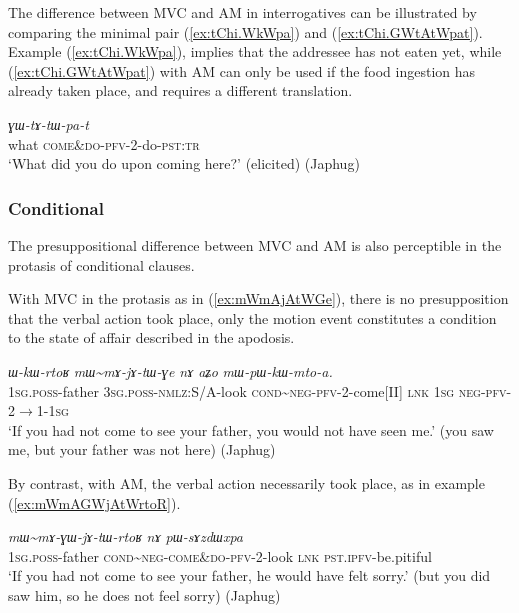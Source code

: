 \documentclass[oneside,a4paper,11pt]{article}
\newcommand{\ipa}[1]{{\phon\textit{#1}}}
\newcommand{\redp}{\textasciitilde}
\newcommand{\rouge}[1]{{\color{red}#1}}
\newcommand{\fl}{$\rightarrow$}
\begin{document}
The difference between MVC and AM in interrogatives can be illustrated by comparing the minimal pair  (\ref{ex:tChi.WkWpa}) and (\ref{ex:tChi.GWtAtWpat}). Example (\ref{ex:tChi.WkWpa}),  implies that the addressee has not eaten yet, while (\ref{ex:tChi.GWtAtWpat}) with AM can only be used if the food ingestion has already taken place, and requires a different translation.

\begin{exe}
\ex \label{ex:tChi.GWtAtWpat}
\gll \ipa{tɕʰi}	\ipa{\rouge{ɣɯ}-tɤ-tɯ-pa-t}  \\
what \rouge{\textsc{come\&do}}-\textsc{pfv}-2-do-\textsc{pst:tr}    \\
\glt `What did you do upon coming here?' (elicited) (Japhug)
\end{exe}

 

\subsubsection{Conditional} \label{sec:am.conditional}
The presuppositional difference between MVC and AM is also perceptible in the protasis of conditional clauses. 

With MVC in the protasis as in (\ref{ex:mWmAjAtWGe}), there is no presupposition that the verbal action took place, only the motion event constitutes a condition to the state of affair described in the apodosis.

\begin{exe}
\ex \label{ex:mWmAjAtWGe}
\gll \ipa{nɤ-wa}	\ipa{ɯ-kɯ-rtoʁ}	\ipa{mɯ\redp{}mɤ-jɤ-tɯ-ɣe}	\ipa{nɤ}	\ipa{aʑo}	\ipa{mɯ-pɯ-kɯ-mto-a.}
 \\
\textsc{1sg.poss}-father \textsc{3sg.poss-}\textsc{nmlz}:S/A-look \textsc{cond}\redp{}\textsc{neg}-\textsc{pfv}-2-come[II] \textsc{lnk} \textsc{1sg} \textsc{neg}-\textsc{pfv}-2\fl{}1-\textsc{1sg} \\
\glt `If you had not come to see your father, you would not have seen me.' (you saw me, but your father was not here) (Japhug)
\end{exe}

By contrast, with AM, the verbal action necessarily took place, as in example (\ref{ex:mWmAGWjAtWrtoR}).

\begin{exe}
\ex \label{ex:mWmAGWjAtWrtoR}
\gll \ipa{nɤ-wa}	\ipa{mɯ\redp{}mɤ-\rouge{ɣɯ}-jɤ-tɯ-rtoʁ}	\ipa{nɤ}	\ipa{pɯ-sɤzdɯxpa} \\
\textsc{1sg.poss}-father \textsc{cond}\redp{}\textsc{neg}-\rouge{\textsc{come\&do}}-\textsc{pfv}-2-look \textsc{lnk} \textsc{pst.ipfv}-be.pitiful \\ 
\glt `If you had not come to see your father, he would have felt sorry.' (but you did saw him, so he does not feel sorry) (Japhug)
\end{exe}
\end{document}
